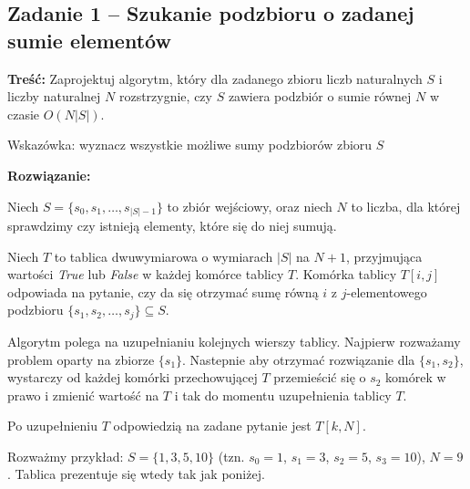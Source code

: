 \subsection{Zadanie 1 -- Szukanie podzbioru o zadanej sumie elementów}
\textbf{Treść: } Zaprojektuj algorytm, który dla zadanego zbioru 
liczb naturalnych $S$ i liczby naturalnej $N$ rozstrzygnie,
czy $S$ zawiera podzbiór o sumie równej $N$ w czasie $O(N |S|)$.

Wskazówka: wyznacz wszystkie możliwe sumy podzbiorów zbioru $S$

\textbf{Rozwiązanie: }

Niech $S = \{s_0, s_1, \dots, s_{|S| - 1}\}$ to zbiór wejściowy, oraz 
niech $N$ to liczba, dla której sprawdzimy czy istnieją elementy, które się do niej sumują.

Niech $T$ to tablica dwuwymiarowa o wymiarach $|S|$ na $N + 1$, przyjmująca wartości 
\textit{True} lub \textit{False} w każdej komórce tablicy $T$.
Komórka tablicy $T[i, j]$ odpowiada na pytanie, czy da się otrzymać 
sumę równą $i$ z $j$-elementowego podzbioru $\{s_1, s_2, \dots, s_j\} \subseteq S$.

Algorytm polega na uzupełnianiu kolejnych wierszy tablicy.
Najpierw rozważamy problem oparty na zbiorze $\{s_1\}$. 
Nastepnie aby otrzymać rozwiązanie dla $\{s_1, s_2\}$, wystarczy
od każdej komórki przechowującej $T$ przemieścić się o $s_2$ komórek w prawo
i zmienić wartość na $T$ i tak do momentu uzupełnienia tablicy $T$.

Po uzupełnieniu $T$ odpowiedzią na zadane pytanie jest $T[k, N]$.

Rozważmy przykład: $S = \{1, 3, 5, 10\}$ (tzn. $s_0=1$, $s_1=3$, $s_2=5$, $s_3=10$), 
$N = 9$. Tablica prezentuje się wtedy tak jak poniżej.

